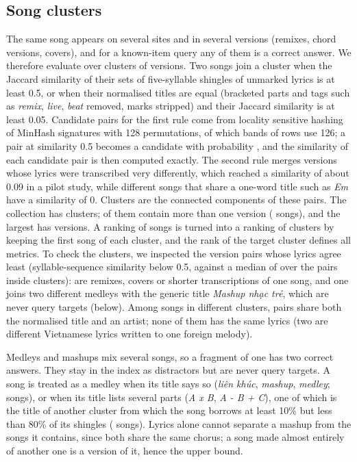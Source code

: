 \documentclass[11pt]{article}
\newcommand{\vi}[1]{\textit{#1}}          %
\begin{document}
\subsection{Song clusters}\label{sec:clusters}
The same song appears on several sites and in several versions (remixes, chord versions, covers), and for
a known-item query any of them is a correct answer. We therefore evaluate over clusters of versions. Two
songs join a cluster when the Jaccard similarity of their sets of five-syllable shingles of unmarked lyrics
is at least 0.5, or when their normalised titles are equal (bracketed parts and tags such as \vi{remix},
\vi{live}, \vi{beat} removed, marks stripped) and their Jaccard similarity is at least 0.05. Candidate pairs
for the first rule come from locality sensitive hashing of MinHash signatures \citep{broder1997resemblance}
with 128 permutations, of which \LSHBands{} bands of \LSHRows{} rows use 126; a pair at similarity 0.5 becomes
a candidate with probability \PCandidate, and the similarity of each candidate pair is then computed exactly. The
second rule merges versions whose lyrics were transcribed very differently, which reached a similarity of
about 0.09 in a pilot study, while different songs that share a one-word title such as \vi{Em} have a
similarity of 0. Clusters are the connected components of these pairs. The collection has \NClusters{}
clusters; \NClustersMulti{} of them contain more than one version (\NSongsInMulti{} songs), and the largest
has \LargestCluster{} versions. A ranking of songs is turned into a ranking of clusters by keeping the first
song of each cluster, and the rank of the target cluster defines all metrics. To check the clusters, we
inspected the \AuditLowPairs{} version pairs whose lyrics agree least (syllable-sequence similarity below 0.5,
against a median of \CluRatioMedian{} over the \CluPairs{} pairs inside clusters): \AuditLowSame{} are remixes,
covers or shorter transcriptions of one song, and one joins two different medleys with the generic title
\vi{Mashup nhạc trẻ}, which are never query targets (below). Among songs in different clusters,
\AuditMissedCand{} pairs share both the normalised title and an artist; none of them has the same lyrics (two
are different Vietnamese lyrics written to one foreign melody).

Medleys and mashups mix several songs, so a fragment of one has two correct answers. They stay in the index
as distractors but are never query targets. A song is treated as a medley when its title says so
(\vi{liên khúc}, \vi{mashup}, \vi{medley}; \NCompTitle{} songs), or when its title lists several parts
(\vi{A x B}, \vi{A - B + C}), one of which is the title of another cluster from which the song borrows at
least 10\% but less than 80\% of its shingles (\NCompLyrics{} songs). Lyrics alone cannot separate a
mashup from the songs it contains, since both share the same chorus; a song made almost entirely of another
one is a version of it, hence the upper bound.
\end{document}

